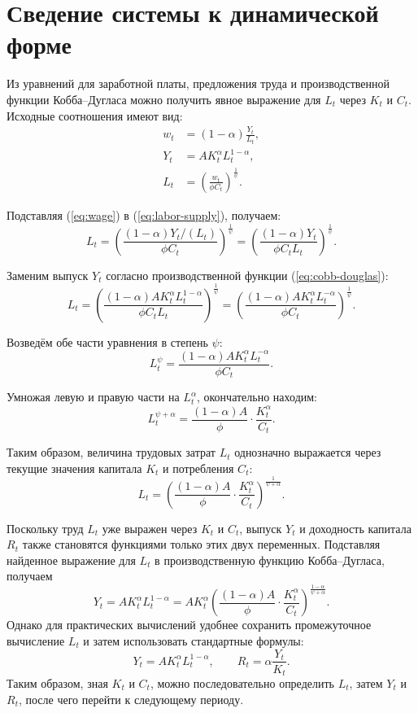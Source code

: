 \section{Сведение системы к динамической форме}

Из уравнений для заработной платы, предложения труда и производственной функции Кобба--Дугласа можно получить явное выражение для $L_t$ через $K_t$ и $C_t$. Исходные соотношения имеют вид:
\begin{align}
    w_t &= (1-\alpha)\frac{Y_t}{L_t}, \label{eq:wage} \\
    Y_t &= A K_t^{\alpha} L_t^{1-\alpha}, \label{eq:cobb-douglas} \\
    L_t &= \left(\frac{w_t}{\phi C_t}\right)^{\frac{1}{\psi}}. \label{eq:labor-supply}
\end{align}

Подставляя (\ref{eq:wage}) в (\ref{eq:labor-supply}), получаем:
\[
L_t = \left( \frac{(1-\alpha)Y_t/(L_t)}{\phi C_t} \right)^{\frac{1}{\psi}}
    = \left( \frac{(1-\alpha)Y_t}{\phi C_t L_t} \right)^{\frac{1}{\psi}}.
\]

Заменим выпуск $Y_t$ согласно производственной функции (\ref{eq:cobb-douglas}):
\[
L_t = \left( \frac{(1-\alpha)A K_t^{\alpha} L_t^{1-\alpha}}{\phi C_t L_t} \right)^{\frac{1}{\psi}}
    = \left( \frac{(1-\alpha)A K_t^{\alpha} L_t^{-\alpha}}{\phi C_t} \right)^{\frac{1}{\psi}}.
\]

Возведём обе части уравнения в степень $\psi$:
\[
L_t^{\psi} = \frac{(1-\alpha)A K_t^{\alpha} L_t^{-\alpha}}{\phi C_t}.
\]

Умножая левую и правую части на $L_t^{\alpha}$, окончательно находим:
\[
L_t^{\psi+\alpha} = \frac{(1-\alpha)A}{\phi} \cdot \frac{K_t^{\alpha}}{C_t}. \label{eq:L-explicit}
\]

Таким образом, величина трудовых затрат $L_t$ однозначно выражается через текущие значения капитала $K_t$ и потребления $C_t$:
\[
L_t = \left( \frac{(1-\alpha)A}{\phi} \cdot \frac{K_t^{\alpha}}{C_t} \right)^{\frac{1}{\psi+\alpha}}.
\]

Поскольку труд $L_t$ уже выражен через $K_t$ и $C_t$, выпуск $Y_t$ и доходность капитала $R_t$ также становятся функциями только этих двух переменных. Подставляя найденное выражение для $L_t$ в производственную функцию Кобба--Дугласа, получаем
\begin{equation}
Y_t = A K_t^{\alpha} L_t^{1-\alpha} = A K_t^{\alpha} 
\left( \frac{(1-\alpha)A}{\phi} \cdot \frac{K_t^{\alpha}}{C_t} \right)^{\frac{1-\alpha}{\psi+\alpha}}.
\end{equation}
Однако для практических вычислений удобнее сохранить промежуточное вычисление $L_t$ и затем использовать стандартные формулы:
\begin{equation}
Y_t = A K_t^{\alpha} L_t^{1-\alpha}, \qquad
R_t = \alpha \frac{Y_t}{K_t}.
\end{equation}
Таким образом, зная $K_t$ и $C_t$, можно последовательно определить $L_t$, затем $Y_t$ и $R_t$, после чего перейти к следующему периоду.

